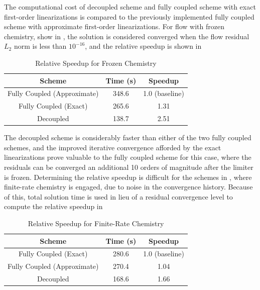 The computational cost of decoupled scheme and fully coupled scheme with exact
first-order linearizations is compared to the previously implemented fully coupled
scheme with approximate first-order linearizations.
For flow with frozen chemistry, show in ,
the solution is considered converged when the flow residual $L_2$ norm is less
than $10^{-16}$, and the relative speedup is shown in
\begin{table}[h]
  \centering
  \begin{tabular}{c|c|c}
    Scheme & Time (s) & Speedup \\
    \hline
    Fully Coupled (Approximate) & 348.6 & 1.0 (baseline) \\
    Fully Coupled (Exact)       & 265.6 & 1.31 \\
    Decoupled                   & 138.7 & 2.51
  \end{tabular}
  \caption{Relative Speedup for Frozen Chemistry}
  \label{tab:srp-rel-speedup-frozen}
\end{table}
The decoupled scheme is considerably faster than either of the two fully coupled
schemes, and the improved iterative convergence afforded by the exact
linearizations prove valuable to the fully coupled scheme for this case, where
the residuals can be converged an additional 10 orders of magnitude after the
limiter is frozen.  Determining the relative speedup is difficult for the
schemes in , where finite-rate chemistry is
engaged, due to noise in the convergence history.  Because of this, total
solution time is used in lieu of a residual convergence level to compute the
relative speedup in 
\begin{table}[h]
  \centering
  \begin{tabular}{c|c|c}
    Scheme & Time (s) & Speedup \\
    \hline
    Fully Coupled (Exact)       & 280.6 & 1.0 (baseline) \\
    Fully Coupled (Approximate) & 270.4 & 1.04 \\
    Decoupled                   & 168.6 & 1.66
  \end{tabular}
  \caption{Relative Speedup for Finite-Rate Chemistry}
  \label{tab:srp-rel-speedup-chem}
\end{table}
